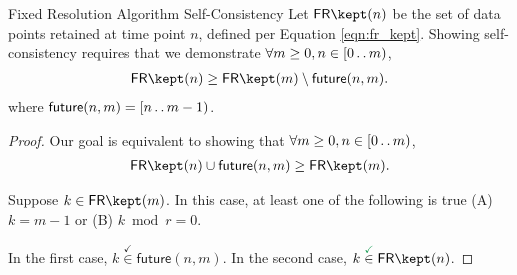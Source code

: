 \begin{theorem}{Fixed Resolution Algorithm Self-Consistency}
\label{thm:fixed-resolution-algo-self-consistency}
Let $\mathsf{FR\kept}(n)$ be the set of data points retained at time point $n$, defined per Equation \ref{eqn:fr_kept}.
Showing self-consistency requires that we demonstrate $\forall m \geq 0, n \in [0 \mathinner {\ldotp \ldotp} m)$,
\begin{align*}
\mathsf{FR\kept}(n)
\geq
\mathsf{FR\kept}(m)
\setminus
\mathsf{future}(n, m).
\end{align*}
where $\mathsf{future}(n, m) = [n \mathinner {\ldotp \ldotp} m - 1)$.
\end{theorem}

\begin{proof}
\label{prf:fixed-resolution-algo-self-consistency}
Our goal is equivalent to showing that $\forall m \geq 0, n \in [0 \mathinner {\ldotp \ldotp} m)$,
\begin{align*}
\mathsf{FR\kept}(n) \cup \mathsf{future}(n, m) \geq \mathsf{FR\kept}(m).
\end{align*}

Suppose $k \in \mathsf{FR\kept}(m)$.
In this case, at least one of the following is true (A) $k = m - 1$ or (B) $k \bmod r = 0$.

In the first case, $k \stackrel{\checkmark}{\in} \mathsf{future}(n, m)$.
In the second case, $k \stackrel{\checkmark}{\in} \mathsf{FR\kept}(n)$.
\end{proof}
